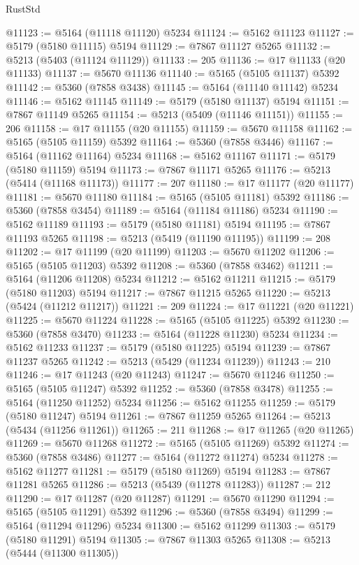 \begin{lexlean}{RustStd}
\begin{coremodule}
@11123 := @5164 (@11118 @11120) @5234
@11124 := @5162 @11123
@11127 := @5179 (@5180 @11115) @5194
@11129 := @7867 @11127 @5265
@11132 := @5213 (@5403 (@11124 @11129))
@11133 := 205
@11136 := @17 @11133 (@20 @11133)
@11137 := @5670 @11136
@11140 := @5165 (@5105 @11137) @5392
@11142 := @5360 (@7858 @3438)
@11145 := @5164 (@11140 @11142) @5234
@11146 := @5162 @11145
@11149 := @5179 (@5180 @11137) @5194
@11151 := @7867 @11149 @5265
@11154 := @5213 (@5409 (@11146 @11151))
@11155 := 206
@11158 := @17 @11155 (@20 @11155)
@11159 := @5670 @11158
@11162 := @5165 (@5105 @11159) @5392
@11164 := @5360 (@7858 @3446)
@11167 := @5164 (@11162 @11164) @5234
@11168 := @5162 @11167
@11171 := @5179 (@5180 @11159) @5194
@11173 := @7867 @11171 @5265
@11176 := @5213 (@5414 (@11168 @11173))
@11177 := 207
@11180 := @17 @11177 (@20 @11177)
@11181 := @5670 @11180
@11184 := @5165 (@5105 @11181) @5392
@11186 := @5360 (@7858 @3454)
@11189 := @5164 (@11184 @11186) @5234
@11190 := @5162 @11189
@11193 := @5179 (@5180 @11181) @5194
@11195 := @7867 @11193 @5265
@11198 := @5213 (@5419 (@11190 @11195))
@11199 := 208
@11202 := @17 @11199 (@20 @11199)
@11203 := @5670 @11202
@11206 := @5165 (@5105 @11203) @5392
@11208 := @5360 (@7858 @3462)
@11211 := @5164 (@11206 @11208) @5234
@11212 := @5162 @11211
@11215 := @5179 (@5180 @11203) @5194
@11217 := @7867 @11215 @5265
@11220 := @5213 (@5424 (@11212 @11217))
@11221 := 209
@11224 := @17 @11221 (@20 @11221)
@11225 := @5670 @11224
@11228 := @5165 (@5105 @11225) @5392
@11230 := @5360 (@7858 @3470)
@11233 := @5164 (@11228 @11230) @5234
@11234 := @5162 @11233
@11237 := @5179 (@5180 @11225) @5194
@11239 := @7867 @11237 @5265
@11242 := @5213 (@5429 (@11234 @11239))
@11243 := 210
@11246 := @17 @11243 (@20 @11243)
@11247 := @5670 @11246
@11250 := @5165 (@5105 @11247) @5392
@11252 := @5360 (@7858 @3478)
@11255 := @5164 (@11250 @11252) @5234
@11256 := @5162 @11255
@11259 := @5179 (@5180 @11247) @5194
@11261 := @7867 @11259 @5265
@11264 := @5213 (@5434 (@11256 @11261))
@11265 := 211
@11268 := @17 @11265 (@20 @11265)
@11269 := @5670 @11268
@11272 := @5165 (@5105 @11269) @5392
@11274 := @5360 (@7858 @3486)
@11277 := @5164 (@11272 @11274) @5234
@11278 := @5162 @11277
@11281 := @5179 (@5180 @11269) @5194
@11283 := @7867 @11281 @5265
@11286 := @5213 (@5439 (@11278 @11283))
@11287 := 212
@11290 := @17 @11287 (@20 @11287)
@11291 := @5670 @11290
@11294 := @5165 (@5105 @11291) @5392
@11296 := @5360 (@7858 @3494)
@11299 := @5164 (@11294 @11296) @5234
@11300 := @5162 @11299
@11303 := @5179 (@5180 @11291) @5194
@11305 := @7867 @11303 @5265
@11308 := @5213 (@5444 (@11300 @11305))

\end{coremodule}
\end{lexlean}
